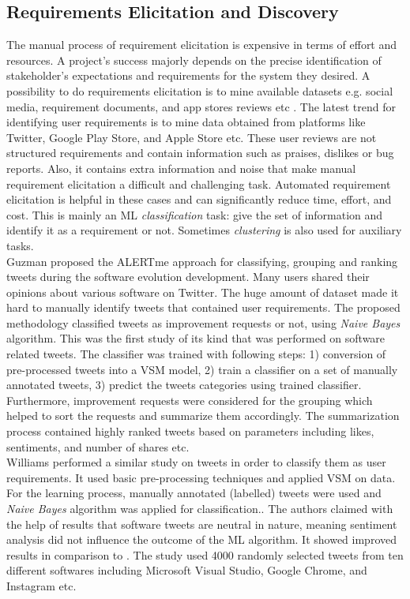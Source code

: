 \subsection{Requirements Elicitation and Discovery}

The manual process of requirement elicitation is expensive in terms of
effort and resources. A project's success majorly depends
on the precise identification of stakeholder's expectations and requirements for
the system they desired.
A possibility to do requirements elicitation is to mine available datasets e.g.
social media, requirement documents, and app stores reviews etc . The latest trend for
identifying user requirements is to mine data obtained from platforms like Twitter,
Google Play Store, and Apple Store etc. These user reviews are not structured requirements
and contain information such as praises, dislikes or bug reports. Also, it contains extra information and noise that make manual requirement elicitation a difficult and challenging task.
Automated requirement elicitation is helpful in these cases and can
significantly reduce time, effort, and cost. This is mainly an ML
\emph{classification} task: give the set of information and identify it as a
requirement or not. Sometimes \emph{clustering} is also used for auxiliary
tasks.\\

Guzman \etal \cite{Guzman:2017} proposed the ALERTme approach for
classifying, grouping and ranking tweets during the software
evolution development. Many users shared their opinions about various software on Twitter. The huge amount of dataset made it hard to manually identify tweets that contained user requirements. The proposed methodology classified tweets as improvement requests or not, using \emph{Naive Bayes} algorithm. This was the first study of
its kind that was performed on software related tweets. 
The classifier was trained with following steps: 1) conversion of
pre-processed tweets into a VSM model, 2) train a classifier
on a set of manually annotated tweets, 3) predict the tweets categories using trained classifier. Furthermore, improvement
requests were considered for the grouping which helped to sort the
requests and summarize them accordingly. The summarization process contained highly ranked tweets based on parameters including likes, sentiments, and number of shares etc.\\

Williams \etal \cite{Williams:2017} performed a similar study on tweets in order
to classify them as user requirements. It used basic pre-processing techniques and applied VSM on data. For the learning
process, manually annotated (labelled) tweets were used and \emph{Naive Bayes} algorithm was applied for classification.. The authors claimed with the help of results that
software tweets are neutral in nature, meaning sentiment analysis did not
influence the outcome of the ML algorithm. It showed improved results in comparison to \cite{Guzman:2017}.
The study used 4000 randomly selected tweets from ten different
softwares including Microsoft Visual Studio, Google Chrome, and Instagram etc.\\

